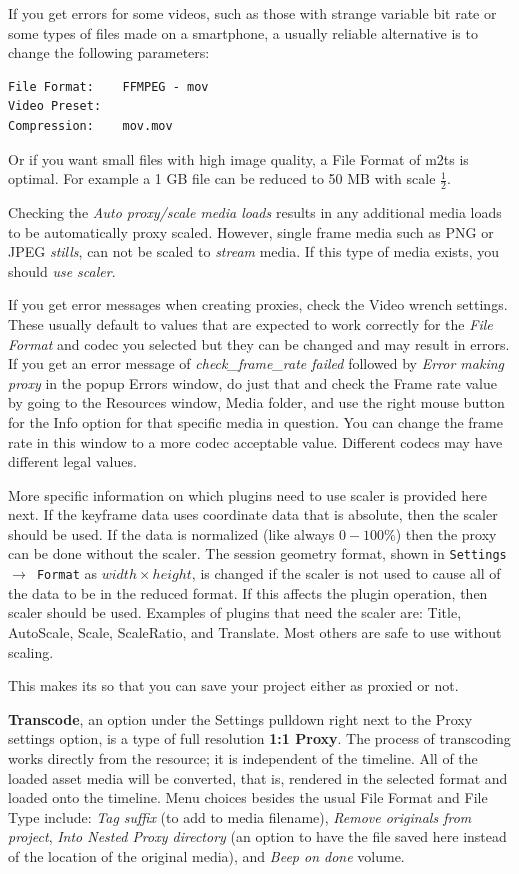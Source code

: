 If you get errors for some videos, such as those with strange variable bit rate or some types of files made on a smartphone, a usually reliable alternative is to change the following parameters:

\begin{lstlisting}[numbers=none]
File Format:	FFMPEG - mov
Video Preset:
Compression:	mov.mov
\end{lstlisting}

Or if you want small files with high image quality, a File Format of m2ts is optimal.  For example a 1 GB file can be reduced to 50 MB with scale $\frac{1}{2}$. 

Checking the \textit{Auto proxy/scale media loads} results in any additional media loads to be automatically proxy scaled.  However, single frame media such as PNG or JPEG \textit{stills}, can not be scaled to \textit{stream} media.  If this type of media exists, you should \textit{use scaler}.

If you get error messages when creating proxies, check the Video wrench settings.  These usually default to values that are expected to work correctly for the \textit{File Format} and codec you selected but they can be changed and may result in errors.  If you get an error message of \textit{check\_frame\_rate failed} followed by \textit{Error making proxy} in the popup Errors window, do just that and check the Frame rate value by going to the Resources window, Media folder, and use the right mouse button for the Info option for that specific media in question.  You can change the frame rate in this window to a more codec acceptable value.  Different codecs may have different legal values.

More specific information on which plugins need to use scaler is provided here next.  If the keyframe data uses coordinate data that is absolute, then the scaler should be used.  If the data is normalized (like always $0-100\%$) then the proxy can be done without the scaler.  The session geometry format, shown in \texttt{Settings $\rightarrow$ Format} as $width \times height$, is changed if the scaler is not used to cause all of the data to be in the reduced format.  If this affects the plugin operation, then scaler should be used.  Examples of plugins that need the scaler are: Title, AutoScale, Scale, ScaleRatio, and Translate.  Most others are safe to use without scaling.

 This makes its so that you can save your project
either as proxied or not.

\textbf{Transcode}, an option under the Settings pulldown right next to the Proxy settings option, is a type of full resolution \textbf{1:1 Proxy}.
The process of transcoding works directly from the resource; it is independent of the timeline. 
All of the loaded asset media will be converted, that is, rendered in the selected format and loaded onto the timeline. 
Menu choices besides the usual File Format and File Type include: \textit{Tag suffix} (to add to media filename), \textit{Remove originals from project}, \textit{Into Nested Proxy directory} (an option to have the file saved here instead of the location of the original media), and \textit{Beep on done} volume.

